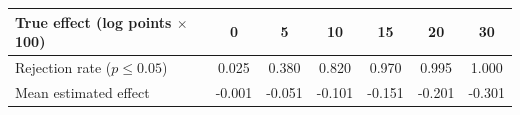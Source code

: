 \begin{tabular}{lcccccc}
\toprule
True effect (log points $\times$ 100) & 0 & 5 & 10 & 15 & 20 & 30 \\
\midrule
Rejection rate ($p \le 0.05$) & 0.025 & 0.380 & 0.820 & 0.970 & 0.995 & 1.000 \\
Mean estimated effect & -0.001 & -0.051 & -0.101 & -0.151 & -0.201 & -0.301 \\
\bottomrule
\end{tabular}
